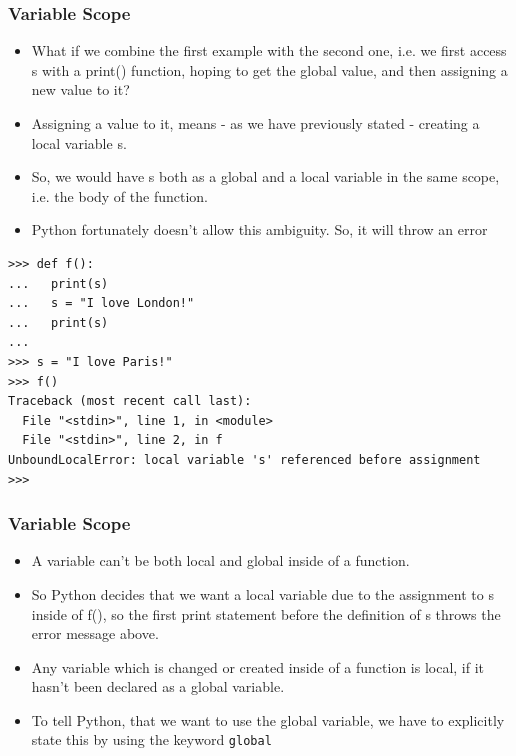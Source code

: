 \begin{frame}[fragile]\frametitle{Variable Scope}

    \begin{itemize}
    \item What if we combine the first example with the second one, i.e. we first access s with a print() function, hoping to get the global value, and then assigning a new value to it? 
    \item Assigning a value to it, means - as we have previously stated - creating a local variable s. 
    \item So, we would have s both as a global and a local variable in the same scope, i.e. the body of the function. 
    \item Python fortunately doesn't allow this ambiguity. So, it will throw an error
    \end{itemize}
\begin{lstlisting}
>>> def f():
...   print(s)
...   s = "I love London!"
...   print(s)
...
>>> s = "I love Paris!"
>>> f()
Traceback (most recent call last):
  File "<stdin>", line 1, in <module>
  File "<stdin>", line 2, in f
UnboundLocalError: local variable 's' referenced before assignment
>>>
\end{lstlisting}

\end{frame}

\begin{frame}[fragile]\frametitle{Variable Scope}

    \begin{itemize}
    \item A variable can't be both local and global inside of a function. 
    	\item So Python decides that we want a local variable due to the assignment to s inside of f(), so the first print statement before the definition of s throws the error message above.
    	\item Any variable which is changed or created inside of a function is local, if it hasn't been declared as a global variable. 
    	\item To tell Python, that we want to use the global variable, we have to explicitly state this by using the keyword \texttt{global}
    \end{itemize}

\end{frame}

